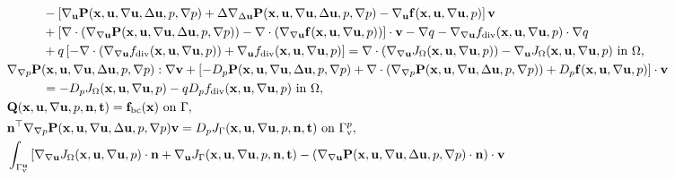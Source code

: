 \documentclass[oneside,11pt]{book}
\numberwithin{equation}{section}
\begin{document}
\begin{itemize}[leftmargin=0in]
\begin{equation}
{\begin{split}
                &\hspace{1cm}- \left[\nabla_{\bf u}{\bf P}({\bf x},{\bf u},\nabla{\bf u},\Delta{\bf u},p,\nabla p) + \Delta\nabla_{\Delta{\bf u}}{\bf P}({\bf x},{\bf u},\nabla{\bf u},\Delta{\bf u},p,\nabla p) - \nabla_{\bf u}{\bf f}({\bf x},{\bf u},\nabla{\bf u},p)\right]{\bf v}\\
                &\hspace{1cm}+ \left[\nabla\cdot\left(\nabla_{\nabla{\bf u}}{\bf P}({\bf x},{\bf u},\nabla{\bf u},\Delta{\bf u},p,\nabla p)\right) - \nabla\cdot\left(\nabla_{\nabla{\bf u}}{\bf f}({\bf x},{\bf u},\nabla{\bf u},p)\right)\right]\cdot{\bf v} - \nabla q - \nabla_{\nabla{\bf u}}f_{\rm div}({\bf x},{\bf u},\nabla{\bf u},p)\cdot\nabla q\\
                &\hspace{1cm}+ q\left[-\nabla\cdot\left(\nabla_{\nabla{\bf u}}f_{\rm div}({\bf x},{\bf u},\nabla{\bf u},p)\right) + \nabla_{\bf u}f_{\rm div}({\bf x},{\bf u},\nabla{\bf u},p)\right] = \nabla\cdot\left(\nabla_{\nabla{\bf u}}J_\Omega({\bf x},{\bf u},\nabla{\bf u},p)\right) - \nabla_{\bf u}J_\Omega({\bf x},{\bf u},\nabla{\bf u},p) \mbox{ in } \Omega,\\
                &\nabla_{\nabla p}{\bf P}({\bf x},{\bf u},\nabla{\bf u},\Delta{\bf u},p,\nabla p):\nabla{\bf v} + \left[-D_p{\bf P}({\bf x},{\bf u},\nabla{\bf u},\Delta{\bf u},p,\nabla p) + \nabla\cdot\left(\nabla_{\nabla p}{\bf P}({\bf x},{\bf u},\nabla{\bf u},\Delta{\bf u},p,\nabla p)\right) + D_p{\bf f}({\bf x},{\bf u},\nabla{\bf u},p)\right]\cdot{\bf v}\\
                &\hspace{1cm} = - D_pJ_\Omega ({\bf x},{\bf u},\nabla{\bf u},p) - qD_pf_{\rm div}({\bf x},{\bf u},\nabla{\bf u},p) \mbox{ in } \Omega,\\
                &{\bf Q}({\bf x},{\bf u},\nabla{\bf u},p,{\bf n},{\bf t}) = {\bf f}_{\rm bc}({\bf x}) \mbox{ on } \Gamma,\\
                &{\bf n}^\top\nabla_{\nabla p}{\bf P}({\bf x},{\bf u},\nabla{\bf u},\Delta{\bf u},p,\nabla p){\bf v} = D_pJ_\Gamma({\bf x},{\bf u},\nabla{\bf u},p,{\bf n},{\bf t}) \mbox{ on } \Gamma_{\rm v}^p,\\
                &\int_{\Gamma_{\rm v}^{\bf u}} \left[\nabla_{\nabla{\bf u}}J_\Omega({\bf x},{\bf u},\nabla{\bf u},p)\cdot{\bf n} + \nabla_{\bf u}J_\Gamma({\bf x},{\bf u},\nabla{\bf u},p,{\bf n},{\bf t}) - \left(\nabla_{\nabla{\bf u}}{\bf P}({\bf x},{\bf u},\nabla{\bf u},\Delta{\bf u},p,\nabla p)\cdot{\bf n}\right)\cdot{\bf v}\right.\\

\end{split}}
\end{equation}
\end{itemize}
\end{document}
